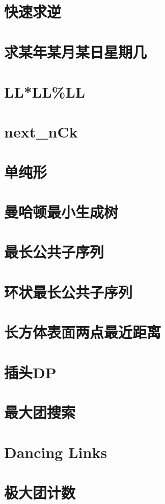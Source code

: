 \documentclass[a4paper,10pt]{book}
\begin{document}
	\section{快速求逆}
		
	\section{求某年某月某日星期几}
		
	\section{LL*LL\%LL} 
		
	\section{next\_nCk}
		
	\section{单纯形}
		
	\section{曼哈顿最小生成树}
		
	\section{最长公共子序列}
		
	\section{环状最长公共子序列}
		
	\section{长方体表面两点最近距离}
		
	\section{插头DP}
		
	\section{最大团搜索}
		
	\section{Dancing Links}
		
	\section{极大团计数}
		
\end{document}
